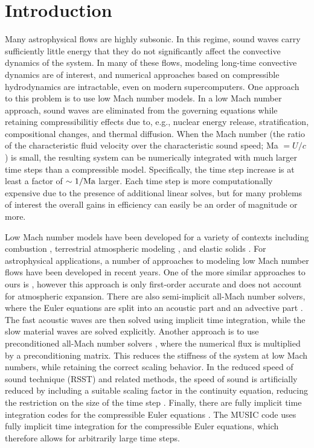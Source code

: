 \section{Introduction} \label{sec:intro}
Many astrophysical flows are highly subsonic.  In this regime,
sound waves carry sufficiently little energy that they do not
significantly affect the convective dynamics of the system.  In many
of these flows, modeling long-time convective dynamics are of
interest, and numerical approaches based on compressible hydrodynamics
are intractable, even on modern supercomputers.  One approach to this
problem is to use low Mach number models.  In a low Mach number
approach, sound waves are eliminated from the governing equations
while retaining compressibilitiy effects due to, e.g., nuclear energy
release, stratification, compositional changes, and thermal diffusion.  When the Mach
number (the ratio of the characteristic fluid velocity over the
characteristic sound speed; Ma $= U/c$) is small, the resulting system
can be numerically integrated with much larger time steps than a
compressible model.  Specifically, the time step increase is at least
a factor of $\sim 1/{\rm Ma}$ larger.  Each time step is more
computationally expensive due to the presence of additional linear
solves, but for many problems of interest the overall gains in
efficiency can easily be an order of magnitude or more.

Low Mach number models have been developed for a variety of contexts
including combustion \citep{day2000numerical}, terrestrial atmospheric
modeling \citep{durran:1989,oneill:2014,duarte2015low}, and elastic
solids \citep{abbate2017all}.  For astrophysical applications, a
number of approaches to modeling low Mach number flows have been
developed in recent years.  One of the more similar approaches to ours is
\cite{Lin:2006}, however this approach is only first-order accurate and does
not account for atmospheric expansion.  There are also semi-implicit all-Mach
number solvers, where the Euler equations are split into an acoustic
part and an advective part
\citep{Kwatra2009,Degond2009,Cordier2012,Haack2012,Happenhofer2013,Chalons2016,Padioleau2019}.
The fast acoustic waves are then solved using implicit time
integration, while the slow material waves are solved explicitly.
Another approach is to use preconditioned all-Mach number solvers
\citep{Miczek2014,Barsukow2016}, where the numerical flux is
multiplied by a preconditioning matrix.  This reduces the stiffness of
the system at low Mach numbers, while retaining the correct scaling
behavior. In the reduced speed of sound technique (RSST) and related
methods, the speed of sound is artificially reduced by including a
suitable scaling factor in the continuity equation, reducing the
restriction on the size of the time step
\citep{Rempel2005,Hotta2012,Wang2015,Takeyama2017,Iijima2018}.
Finally, there are fully implicit time integration codes for the
compressible Euler equations
\citep{Viallet2011,kifonidis:2012,Viallet2015,Goffrey2016}.  The MUSIC code
uses fully implicit time integration for the compressible Euler
equations, which therefore allows for arbitrarily large time steps.

